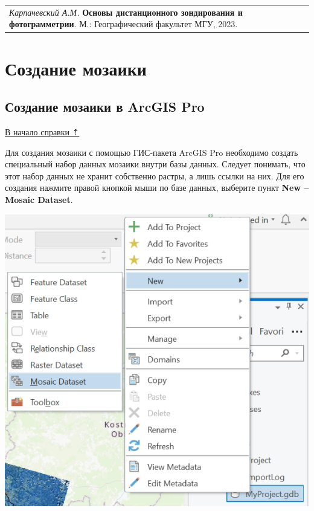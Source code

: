\documentclass[
  12pt,
]{book}
\begin{document}
\begin{longtable}[]{@{}l@{}}
\toprule\noalign{}
\endhead
\bottomrule\noalign{}
\endlastfoot
\emph{Карпачевский А.М.} \textbf{Основы дистанционного зондирования и фотограмметрии}. М.: Географический факультет МГУ, 2023. \\
\end{longtable}

\hypertarget{mosaic}{%
\chapter{Создание мозаики}\label{mosaic}}

\hypertarget{mosaic-arcgis}{%
\section{Создание мозаики в ArcGIS Pro}\label{mosaic-arcgis}}

\protect\hyperlink{mosaic}{В начало справки ⇡}

Для создания мозаики с помощью ГИС-пакета ArcGIS Pro необходимо создать специальный набор данных мозаики внутри базы данных. Следует понимать, что этот набор данных не хранит собственно растры, а лишь ссылки на них. Для его создания нажмите правой кнопкой мыши по базе данных, выберите пункт \textbf{New -- Mosaic Dataset}.

\includegraphics{images/Ref03/New_Mosaic.png}
\end{document}
